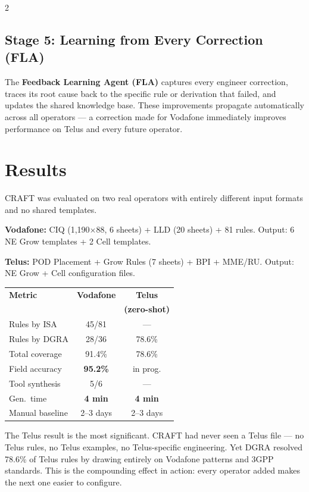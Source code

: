 \documentclass[10.5pt]{article}
\begin{document}
\begin{multicols}{2}
\subsection*{Stage 5: Learning from Every Correction (FLA)}

The \textbf{Feedback Learning Agent (FLA)} captures every engineer correction, traces its root
cause back to the specific rule or derivation that failed, and updates the shared knowledge base.
These improvements propagate automatically across all operators --- a correction made for Vodafone
immediately improves performance on Telus and every future operator.

\section{Results}

CRAFT was evaluated on two real operators with entirely different input formats and no shared
templates.

\textbf{Vodafone:} CIQ (1,190$\times$88, 6 sheets) + LLD (20 sheets) + 81 rules. Output: 6 NE
Grow templates + 2 Cell templates.

\textbf{Telus:} POD Placement + Grow Rules (7 sheets) + BPI + MME/RU. Output: NE Grow + Cell
configuration files.

\vspace{3pt}
\begin{center}
\renewcommand{\arraystretch}{1.2}
\small
\begin{tabular}{lcc}
\toprule
\textbf{Metric} & \textbf{Vodafone} & \textbf{Telus} \\
                &                   & \textbf{(zero-shot)} \\
\midrule
Rules by ISA     & 45/81   & ---       \\
Rules by DGRA    & 28/36   & 78.6\%   \\
Total coverage   & 91.4\%  & 78.6\%   \\
Field accuracy   & \textbf{95.2\%} & in prog. \\
Tool synthesis   & 5/6     & ---       \\
Gen.\ time       & \textbf{4 min}  & \textbf{4 min} \\
Manual baseline  & 2--3 days & 2--3 days \\
\bottomrule
\end{tabular}
\end{center}
\vspace{3pt}

The Telus result is the most significant. CRAFT had never seen a Telus file --- no Telus rules,
no Telus examples, no Telus-specific engineering. Yet DGRA resolved 78.6\% of Telus rules by
drawing entirely on Vodafone patterns and 3GPP standards. This is the compounding effect in
action: every operator added makes the next one easier to configure.


\end{multicols}
\end{document}
